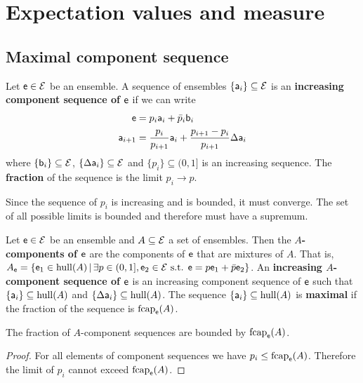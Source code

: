 \section{Expectation values and measure}

\subsection{Maximal component sequence}

\begin{defn}
	Let $\ens \in \Ens$ be an ensemble. A sequence of ensembles $\{\ens[a]_i\} \subseteq \Ens$ is an \textbf{increasing component sequence of $\ens$} if we can write
	\begin{align*}
		\ens &= p_i \ens[a]_i + \bar{p}_i \ens[b]_i  \\
		\ens[a]_{i+1} &= \frac{p_i}{p_{i+1}} \ens[a]_i + \frac{p_{i+1} - p_i}{p_{i+1}} \Delta \ens[a]_i
	\end{align*}
	where $\{\ens[b]_i\} \subseteq \Ens$, $\{\Delta\ens[a]_i\} \subseteq \Ens$ and $\{p_i\} \subseteq (0,1]$ is an increasing sequence. The \textbf{fraction} of the sequence is the limit $p_i \to p$.
\end{defn}

\begin{remark}
	Since the sequence of $p_i$ is increasing and is bounded, it must converge. The set of all possible limits is bounded and therefore must have a supremum.
\end{remark}

\begin{defn}
	Let $\ens \in \Ens$ be an ensemble and $A \subseteq \Ens$ a set of ensembles. Then the \textbf{$A$-components of $\ens$} are the components of $\ens$ that are mixtures of $A$. That is, $A_{\ens} = \{ \ens_1 \in \hull(A) \, | \, \exists p \in (0,1], \ens_2 \in \Ens \text{ s.t. } \ens = p \ens_1 + \bar{p} \ens_2  \}$. An \textbf{increasing $A$-component sequence of $\ens$} is an increasing component sequence of $\ens$ such that $\{\ens[a]_i\} \subseteq \hull(A)$ and $\{\Delta\ens[a]_i\} \subseteq \hull(A)$. The sequence $\{\ens[a]_i\} \subseteq \hull(A)$ is \textbf{maximal} if the fraction of the sequence is $\fcap_{\ens}(A)$.
\end{defn}

\begin{coro}
	The fraction of $A$-component sequences are bounded by $\fcap_{\ens}(A)$.
\end{coro}

\begin{proof}
	For all elements of component sequences we have $p_i \leq \fcap_{\ens}(A)$. Therefore the limit of $p_i$ cannot exceed $\fcap_{\ens}(A)$.
\end{proof}

